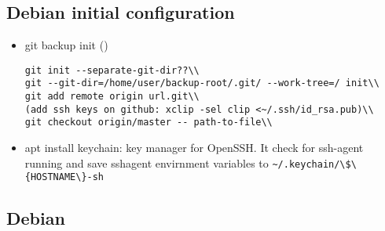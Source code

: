 \subsection{Debian initial configuration}

\begin{itemize}
\item git backup init ()
\begin{lstlisting}
git init --separate-git-dir??\\
git --git-dir=/home/user/backup-root/.git/ --work-tree=/ init\\
git add remote origin url.git\\
(add ssh keys on github: xclip -sel clip <~/.ssh/id_rsa.pub)\\
git checkout origin/master -- path-to-file\\
\end{lstlisting}
\item apt install keychain: key manager for OpenSSH. It check for ssh-agent running and save sshagent envirnment variables to \verb=~/.keychain/\$\{HOSTNAME\}-sh=

\end{itemize}

\subsection{Debian}

